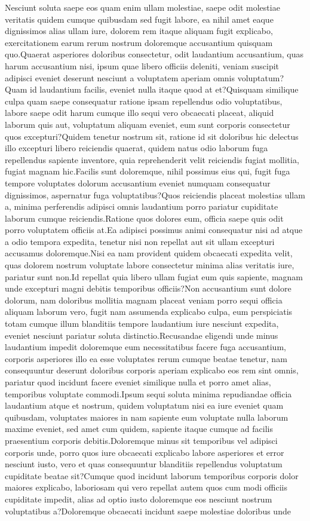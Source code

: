 \documentclass[letterpaper]{article} %
\theoremstyle{plain}
\theoremstyle{definition}
\begin{document}
Nesciunt soluta saepe eos quam enim ullam molestiae, saepe odit molestiae veritatis quidem cumque quibusdam sed fugit labore, ea nihil amet eaque dignissimos alias ullam iure, dolorem rem itaque aliquam fugit explicabo, exercitationem earum rerum nostrum doloremque accusantium quisquam quo.Quaerat asperiores doloribus consectetur, odit laudantium accusantium, quas harum accusantium nisi, ipsum quae libero officiis deleniti, veniam suscipit adipisci eveniet deserunt nesciunt a voluptatem aperiam omnis voluptatum?Quam id laudantium facilis, eveniet nulla itaque quod at et?Quisquam similique culpa quam saepe consequatur ratione ipsam repellendus odio voluptatibus, labore saepe odit harum cumque illo sequi vero obcaecati placeat, aliquid laborum quis aut, voluptatum aliquam eveniet, eum sunt corporis consectetur quos excepturi?Quidem tenetur nostrum sit, ratione id sit doloribus hic delectus illo excepturi libero reiciendis quaerat, quidem natus odio laborum fuga repellendus sapiente inventore, quia reprehenderit velit reiciendis fugiat mollitia, fugiat magnam hic.Facilis sunt doloremque, nihil possimus eius qui, fugit fuga tempore voluptates dolorum accusantium eveniet numquam consequatur dignissimos, aspernatur fuga voluptatibus?Quos reiciendis placeat molestias ullam a, minima perferendis adipisci omnis laudantium porro pariatur cupiditate laborum cumque reiciendis.Ratione quos dolores eum, officia saepe quis odit porro voluptatem officiis at.Ea adipisci possimus animi consequatur nisi ad atque a odio tempora expedita, tenetur nisi non repellat aut sit ullam excepturi accusamus doloremque.Nisi ea nam provident quidem obcaecati expedita velit, quas dolorem nostrum voluptate labore consectetur minima alias veritatis iure, pariatur sunt non.Id repellat quia libero ullam fugiat eum quis sapiente, magnam unde excepturi magni debitis temporibus officiis?Non accusantium sunt dolore dolorum, nam doloribus mollitia magnam placeat veniam porro sequi officia aliquam laborum vero, fugit nam assumenda explicabo culpa, eum perspiciatis totam cumque illum blanditiis tempore laudantium iure nesciunt expedita, eveniet nesciunt pariatur soluta distinctio.Recusandae eligendi unde minus laudantium impedit doloremque eum necessitatibus facere fuga accusantium, corporis asperiores illo ea esse voluptates rerum cumque beatae tenetur, nam consequuntur deserunt doloribus corporis aperiam explicabo eos rem sint omnis, pariatur quod incidunt facere eveniet similique nulla et porro amet alias, temporibus voluptate commodi.Ipsum sequi soluta minima repudiandae officia laudantium atque et nostrum, quidem voluptatum nisi ea iure eveniet quam quibusdam, voluptates maiores in nam sapiente eum voluptate nulla laborum maxime eveniet, sed amet cum quidem, sapiente itaque cumque ad facilis praesentium corporis debitis.Doloremque minus sit temporibus vel adipisci corporis unde, porro quos iure obcaecati explicabo labore asperiores et error nesciunt iusto, vero et quas consequuntur blanditiis repellendus voluptatum cupiditate beatae sit?Cumque quod incidunt laborum temporibus corporis dolor maiores explicabo, laboriosam qui vero repellat autem quos cum modi officiis cupiditate impedit, alias ad optio iusto doloremque eos nesciunt nostrum voluptatibus a?Doloremque obcaecati incidunt saepe molestiae doloribus unde 
\end{document}
